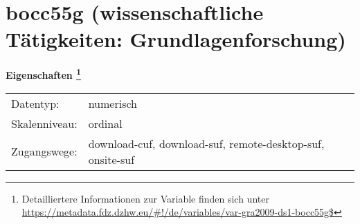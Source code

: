 
    \setcounter{footnote}{0}

    \vspace*{-1.8cm}
	\section{bocc55g (wissenschaftliche Tätigkeiten: Grundlagenforschung)}
	\label{section:bocc55g}



    \vspace*{0.5cm}
    \noindent\textbf{Eigenschaften
	\footnote{Detailliertere Informationen zur Variable finden sich unter
		\url{https://metadata.fdz.dzhw.eu/\#!/de/variables/var-gra2009-ds1-bocc55g$}}}\\
	\begin{tabularx}{\hsize}{@{}lX}
	Datentyp: & numerisch \\
	Skalenniveau: & ordinal \\
	Zugangswege: &
	  download-cuf, 
	  download-suf, 
	  remote-desktop-suf, 
	  onsite-suf
 \\
    \end{tabularx}



